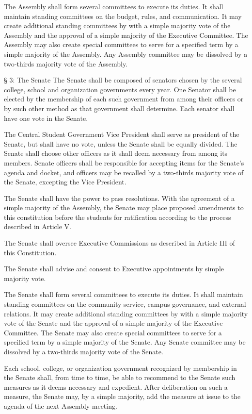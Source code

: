     The Assembly shall form several committees to execute its duties. It shall maintain standing committees on the budget, rules, and communication. It may create additional standing committees by with a simple majority vote of the Assembly and the approval of a simple majority of the Executive Committee. The Assembly may also create special committees to serve for a specified term by a simple majority of the Assembly. Any Assembly committee may be dissolved by a two-thirds majority vote of the Assembly.

§ 3: The Senate
    The Senate shall be composed of senators chosen by the several college, school and organization governments every year. One Senator shall be elected by the membership of each such government from among their officers or by such other method as that government shall determine. Each senator shall have one vote in the Senate.

    The Central Student Government Vice President shall serve as president of the Senate, but shall have no vote, unless the Senate shall be equally divided. The Senate shall choose other officers as it shall deem necessary from among its members. Senate officers shall be responsible for accepting items for the Senate's agenda and docket, and officers may be recalled by a two-thirds majority vote of the Senate, excepting the Vice President.

    The Senate shall have the power to pass resolutions. With the agreement of a simple majority of the Assembly, the Senate may place proposed amendments to this constitution before the students for ratification according to the process described in Article V.

    The Senate shall oversee Executive Commissions as described in Article III of this Constitution.

    The Senate shall advise and consent to Executive appointments by simple majority vote.

    The Senate shall form several committees to execute its duties. It shall maintain standing committees on the community service, campus governance, and external relations. It may create additional standing committees by with a simple majority vote of the Senate and the approval of a simple majority of the Executive Committee. The Senate may also create special committees to serve for a specified term by a simple majority of the Senate. Any Senate committee may be dissolved by a two-thirds majority vote of the Senate.

    Each school, college, or organization government recognized by membership in the Senate shall, from time to time, be able to recommend to the Senate such measures as it deems necessary and expedient. After deliberation on such a measure, the Senate may, by a simple majority, add the measure at issue to the agenda of the next Assembly meeting.

